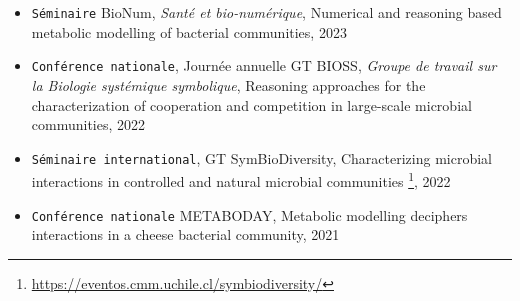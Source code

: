 \documentclass[../main.tex]{subfiles}
\begin{document}
\begin{itemize}
	\item \texttt{Séminaire} BioNum, \textit{Santé et bio-numérique}, Numerical and reasoning based metabolic modelling of bacterial communities, 2023
	\item \texttt{Conférence nationale}, Journée annuelle GT BIOSS, \textit{Groupe de travail sur la Biologie systémique symbolique}, Reasoning approaches for the characterization of cooperation and competition in large-scale microbial communities, 2022
	\item \texttt{Séminaire international}, GT SymBioDiversity, Characterizing microbial interactions in controlled and natural microbial communities \footnote{\url{https://eventos.cmm.uchile.cl/symbiodiversity/}}, 2022
	\item \texttt{Conférence nationale} METABODAY, Metabolic modelling deciphers interactions in a cheese bacterial community, 2021
\end{itemize} 
\end{document}
